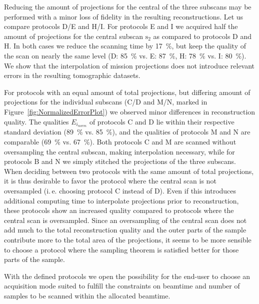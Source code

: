 \documentclass[preprint,s]{iucr}
\newcommand{\ie}{i.\,e. }
\begin{document}
Reducing the amount of projections for the central of the three subscans may be performed with a minor loss of fidelity in the resulting reconstructions. Let us compare protocols D/E and H/I. For protocols E and I we acquired half the amount of projections for the central subscan $\textrm{s}_{2}$ as compared to protocols D and H. In both cases we reduce the scanning time by \SI{17}{\percent}, but keep the quality of the scan on nearly the same level (D: \SI{85}{\percent} vs. E: \SI{87}{\percent}, H: \SI{78}{\percent} vs. I: \SI{80}{\percent}).
We show that the interpolation of mission projections does not introduce relevant errors in the resulting tomographic datasets.

For protocols with an equal amount of total projections, but differing amount of projections for the individual subscans (C/D and M/N, marked in Figure~\ref{fig:NormalizedErrorPlot}) we observed minor differences in reconstruction quality. The qualities $E_{i_{norm}}$ of protocols C and D lie within their respective standard deviation (\SI{89}{\percent} vs. \SI{85}{\percent}), and the qualities of protocols M and N are comparable (\SI{69}{\percent} vs. \SI{67}{\percent}). Both protocols C and M are scanned without oversampling the central subscan, making interpolation necessary, while for protocols B and N we simply stitched the projections of the three subscans. When deciding between two protocols with the same amount of total projections, it is thus desirable to favor the protocol where the central scan is not oversampled (\ie choosing protocol C instead of D). Even if this introduces additional computing time to interpolate projections prior to reconstruction, these protocols show an increased quality compared to protocols where the central scan is oversampled. Since an oversampling of the central scan does not add much to the total reconstruction quality and the outer parts of the sample contribute more to the total area of the projections, it seems to be more sensible to choose a protocol where the sampling theorem is satisfied better for those parts of the sample.

With the defined protocols we open the possibility for the end-user to choose an acquisition mode suited to fulfill the constraints on beamtime and number of samples to be scanned within the allocated beamtime. 
\end{document}
